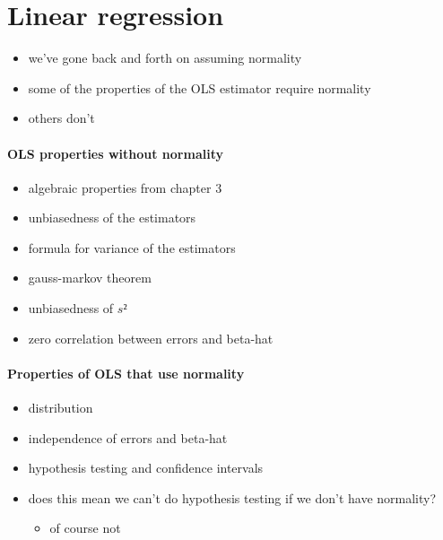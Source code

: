 

\part*{Linear regression}%

\begin{itemize}
\item we've gone back and forth on assuming normality
\item some of the properties of the OLS estimator require normality
\item others don't
\end{itemize}

\subsection{OLS properties without normality}

\begin{itemize}
\item algebraic properties from chapter 3
\item unbiasedness of the estimators
\item formula for variance of the estimators
\item gauss-markov theorem
\item unbiasedness of $s²$
\item zero correlation between errors and beta-hat
\end{itemize}

\subsection{Properties of OLS that use normality}

\begin{itemize}
\item distribution
\item independence of errors and beta-hat
\item hypothesis testing and confidence intervals
\item does this mean we can't do hypothesis testing if we don't have
       normality?
\begin{itemize}
\item of course not
\end{itemize}
\end{itemize}

